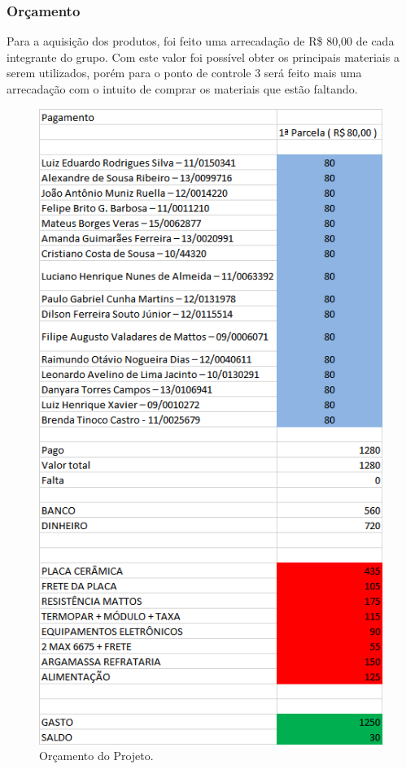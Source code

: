 \subsubsection{Orçamento}
Para a aquisição dos produtos, foi feito uma arrecadação de R\$ 80,00 de cada integrante do grupo. Com este valor foi possível obter os principais materiais a serem utilizados, porém para o ponto de controle 3 será feito mais uma arrecadação com o intuito de comprar os materiais que estão faltando.

\begin{figure}[H]
	\centering
	\label{custo}
	\includegraphics[keepaspectratio=true,scale=0.8]{figuras/orcamento.jpg}
	\caption{Orçamento do Projeto.}
\end{figure}


